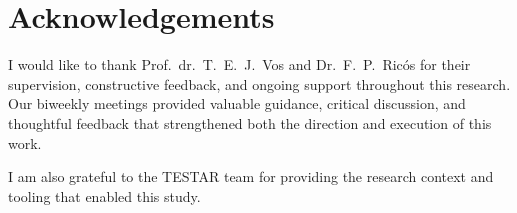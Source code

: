 \chapter{Acknowledgements}

I would like to thank Prof.\ dr.\ T.\ E.\ J.\ Vos and Dr.\ F.\ P.\ Ric\'os for their supervision, constructive feedback, and ongoing support throughout this research. Our biweekly meetings provided valuable guidance, critical discussion, and thoughtful feedback that strengthened both the direction and execution of this work.

I am also grateful to the TESTAR team for providing the research context and tooling that enabled this study.
